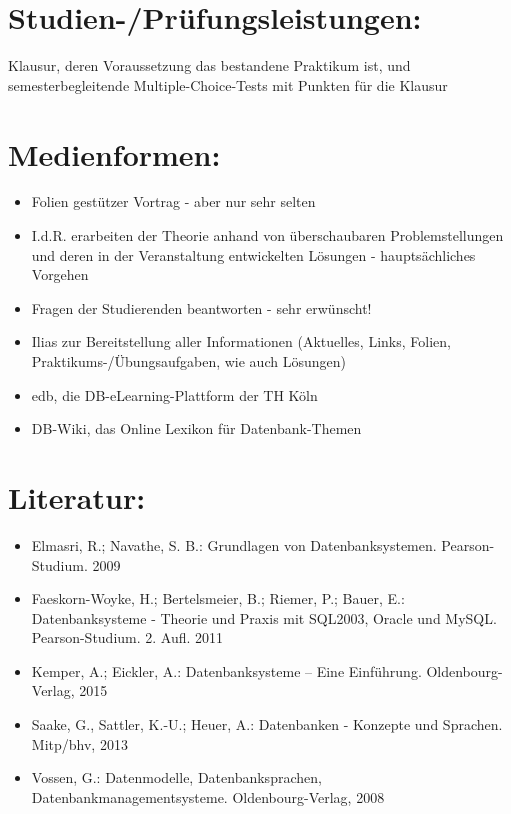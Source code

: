 \section{Studien-/Prüfungsleistungen:}\label{studien-pruxfcfungsleistungen-7}

Klausur, deren Voraussetzung das bestandene Praktikum ist, und
semesterbegleitende Multiple-Choice-Tests mit Punkten für die Klausur

\section{Medienformen:}\label{medienformen-7}

\begin{itemize}
\tightlist
\item
  Folien gestützer Vortrag - aber nur sehr selten\\
\item
  I.d.R. erarbeiten der Theorie anhand von überschaubaren
  Problemstellungen und deren in der Veranstaltung entwickelten Lösungen
  - hauptsächliches Vorgehen\\
\item
  Fragen der Studierenden beantworten - sehr erwünscht!\\
\item
  Ilias zur Bereitstellung aller Informationen (Aktuelles, Links,
  Folien, Praktikums-/Übungsaufgaben, wie auch Lösungen)\\
\item
  edb, die DB-eLearning-Plattform der TH Köln\\
\item
  DB-Wiki, das Online Lexikon für Datenbank-Themen
\end{itemize}

\section{Literatur:}\label{literatur-7}

\begin{itemize}
\item
  Elmasri, R.; Navathe, S. B.: Grundlagen von Datenbanksystemen.
  Pearson-Studium. 2009
\item
  Faeskorn-Woyke, H.; Bertelsmeier, B.; Riemer, P.; Bauer, E.:
  Datenbanksysteme - Theorie und Praxis mit SQL2003, Oracle und MySQL.
  Pearson-Studium. 2. Aufl. 2011
\item
  Kemper, A.; Eickler, A.: Datenbanksysteme -- Eine Einführung.
  Oldenbourg-Verlag, 2015
\item
  Saake, G., Sattler, K.-U.; Heuer, A.: Datenbanken - Konzepte und
  Sprachen. Mitp/bhv, 2013
\item
  Vossen, G.: Datenmodelle, Datenbanksprachen,
  Datenbankmanagementsysteme. Oldenbourg-Verlag, 2008
\end{itemize}

